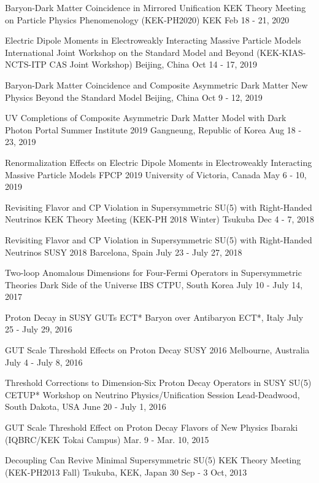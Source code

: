 \begin{talklist}
\talkentry
  {Baryon-Dark Matter Coincidence in Mirrored Unification}
  {KEK Theory Meeting on Particle Physics Phenomenology (KEK-PH2020)}
  {KEK}
  {Feb 18 - 21, 2020}
  {}

\talkentry
  {Electric Dipole Moments in Electroweakly Interacting Massive Particle Models}
  {International Joint Workshop on the Standard Model and Beyond (KEK-KIAS-NCTS-ITP CAS Joint Workshop)}
  {Beijing, China}
  {Oct 14 - 17, 2019}
  {}

\talkentry
  {Baryon-Dark Matter Coincidence and Composite Asymmetric Dark Matter}
  {New Physics Beyond the Standard Model}
  {Beijing, China}
  {Oct 9 - 12, 2019}
  {}

\talkentry
  {UV Completions of Composite Asymmetric Dark Matter Model with Dark Photon Portal}
  {Summer Institute 2019}
  {Gangneung, Republic of Korea}
  {Aug 18 - 23, 2019}
  {}

\talkentry
  {Renormalization Effects on Electric Dipole Moments in Electroweakly Interacting Massive Particle Models}
  {FPCP 2019}
  {University of Victoria, Canada}
  {May 6 - 10, 2019}
  {}

\talkentry
  {Revisiting Flavor and CP Violation in Supersymmetric SU(5) with Right-Handed Neutrinos}
  {KEK Theory Meeting (KEK-PH 2018 Winter)}
  {Tsukuba}
  {Dec 4 - 7, 2018}
  {}

\talkentry
  {Revisiting Flavor and CP Violation in Supersymmetric SU(5) with Right-Handed Neutrinos}
  {SUSY 2018}
  {Barcelona, Spain}
  {July 23 - July 27, 2018}
  {}

\talkentry
  {Two-loop Anomalous Dimensions for Four-Fermi Operators in Supersymmetric Theories}
  {Dark Side of the Universe}
  {IBS CTPU, South Korea}
  {July 10 - July 14, 2017}
  {}

\talkentry
  {Proton Decay in SUSY GUTs}
  {ECT* Baryon over Antibaryon}
  {ECT*, Italy}
  {July 25 - July 29, 2016}
  {}

\talkentry
  {GUT Scale Threshold Effects on Proton Decay}
  {SUSY 2016}
  {Melbourne, Australia}
  {July 4 - July 8, 2016}
  {}

\talkentry
  {Threshold Corrections to Dimension-Six Proton Decay Operators in SUSY SU(5)}
  {CETUP* Workshop on Neutrino Physics/Unification Session}
  {Lead-Deadwood, South Dakota, USA}
  {June 20 - July 1, 2016}
  {}

\talkentry
  {GUT Scale Threshold Effect on Proton Decay}
  {Flavors of New Physics}
  {Ibaraki (IQBRC/KEK Tokai Campus)}
  {Mar. 9 - Mar. 10, 2015}
  {}

\talkentry
  {Decoupling Can Revive Minimal Supersymmetric SU(5)}
  {KEK Theory Meeting (KEK-PH2013 Fall)}
  {Tsukuba, KEK, Japan}
  {30 Sep - 3 Oct, 2013}
  {}

\end{talklist}
